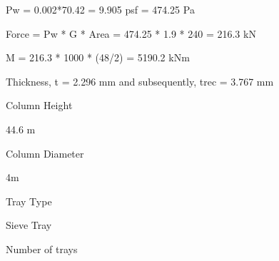 \documentclass[a4paper,portrait,12pt]{article}
\begin{document}
\begin{flushleft}
Pw = 0.002*70.42 = 9.905 psf = 474.25 Pa
\end{flushleft}


\begin{flushleft}
Force = Pw * G * Area = 474.25 * 1.9 * 240 = 216.3 kN
\end{flushleft}





\begin{flushleft}
M = 216.3 * 1000 * (48/2) = 5190.2 kNm
\end{flushleft}


\begin{flushleft}
Thickness, t = 2.296 mm and subsequently, trec = 3.767 mm
\end{flushleft}


\begin{flushleft}
Column Height
\end{flushleft}





\begin{flushleft}
44.6 m
\end{flushleft}





\begin{flushleft}
Column Diameter
\end{flushleft}





\begin{flushleft}
4m
\end{flushleft}





\begin{flushleft}
Tray Type
\end{flushleft}





\begin{flushleft}
Sieve Tray
\end{flushleft}





\begin{flushleft}
Number of trays
\end{flushleft}
\end{document}

